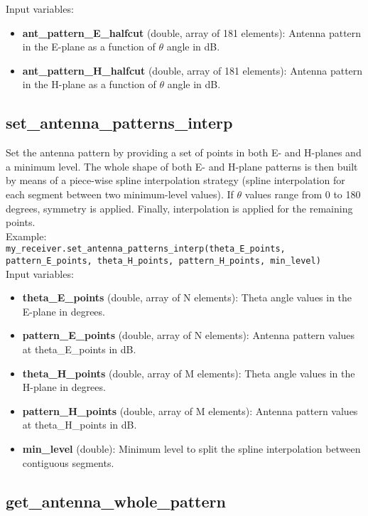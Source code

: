 Input variables:
\begin{itemize}
\item {\bf ant\_pattern\_E\_halfcut} (double, array of 181 elements): Antenna pattern in the E-plane as a function of $\theta$ angle in dB.
\item {\bf ant\_pattern\_H\_halfcut} (double, array of 181 elements): Antenna pattern in the H-plane as a function of $\theta$ angle in dB.
\end{itemize}


\subsection{set\_antenna\_patterns\_interp}

Set the antenna pattern by providing a set of points in both E- and H-planes and a minimum level. The whole shape of both E- and H-plane patterns is then built by means of a piece-wise spline interpolation strategy (spline interpolation for each segment between two minimum-level values). If $\theta$ values range from 0 to 180 degrees, symmetry is applied. Finally, interpolation is applied for the remaining points.\\

Example:\\

\texttt{my\_receiver.set\_antenna\_patterns\_interp(theta\_E\_points, pattern\_E\_points, theta\_H\_points, pattern\_H\_points, min\_level)}\\

Input variables:
\begin{itemize}
\item {\bf theta\_E\_points} (double, array of N elements): Theta angle values in the E-plane in degrees.
\item {\bf pattern\_E\_points} (double, array of N elements): Antenna pattern values at theta\_E\_points in dB.
\item {\bf theta\_H\_points} (double, array of M elements): Theta angle values in the H-plane in degrees.
\item {\bf pattern\_H\_points} (double, array of M elements): Antenna pattern values at theta\_H\_points in dB.
\item {\bf min\_level} (double): Minimum level to split the spline interpolation between contiguous segments.
\end{itemize}


\subsection{get\_antenna\_whole\_pattern}

